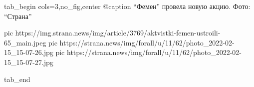  
 
 
 
 


\ifcmt
  tab_begin cols=3,no_fig,center
		 @caption \enquote{Фемен} провела новую акцию. Фото: \enquote{Страна} 

     pic https://img.strana.news/img/article/3769/aktvistki-femen-ustroili-65_main.jpeg
		 pic https://strana.news/img/forall/u/11/62/photo_2022-02-15_15-07-26.jpg
		 pic https://strana.news/img/forall/u/11/62/photo_2022-02-15_15-07-27.jpg

  tab_end
\fi
